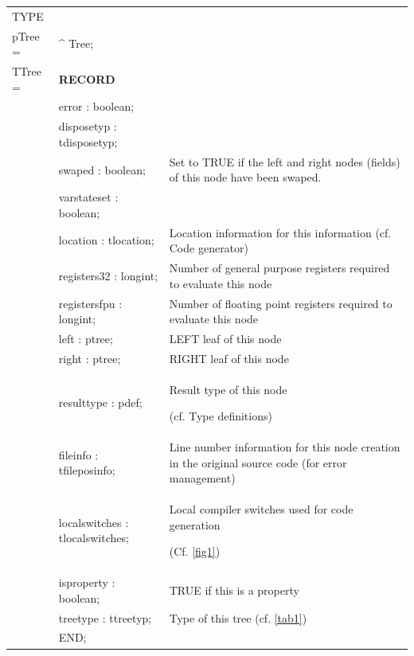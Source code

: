 \documentclass [12pt]{article}
\begin{document}
\begin{tabular*}{6.5in}{|l@{\extracolsep{\fill}}lp{8.5cm}|}
\hline
\textsf{TYPE}& & \\
\xspace pTree = & \^{}  Tree; & \\
\xspace \textsf{TTree} = & \textbf{RECORD}& \\
 & \textsf{error : boolean;}&  \\
 &\textsf{disposetyp : tdisposetyp;}& 
 \\
 &\textsf{swaped : boolean;}& 
Set to TRUE if the left and right nodes (fields) of this node have been swaped. \\
 & \textsf{varstateset : boolean;}& 
 \\
 & \textsf{location : tlocation;}& 
Location information for this information (cf. Code generator) \\
 & \textsf{registers32 : longint;}& 
Number of general purpose registers required to evaluate this node \\
 & \textsf{registersfpu : longint;}& 
Number of floating point registers required to evaluate this node \\
 & \textsf{left : ptree;}& 
LEFT leaf of this node \\
 & \textsf{right : ptree;}& 
RIGHT leaf of this node \\
 & \textsf{resulttype : pdef;}& 
Result type of this node  \par (cf. Type definitions) \\
 & \textsf{fileinfo : tfileposinfo;}& 
Line number information for this node creation in the original source code (for error management) \\
 & \textsf{localswitches : tlocalswitches;}& 
Local compiler switches used for code generation \par (Cf. \ref{fig1}) \\
 & \textsf{isproperty : boolean;}& 
TRUE if this is a property \\
 & \textsf{treetype : ttreetyp;}& 
Type of this tree (cf. \ref{tab1}) \\
 & \textsf{END;}&   \\
\hline
\end{tabular*}
\end{document}

